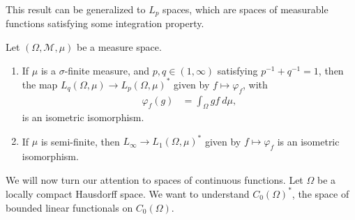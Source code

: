 \documentclass[10pt]{mypackage}
\begin{document}
This result can be generalized to $L_{p}$ spaces, which are spaces of measurable functions satisfying some integration property.
\begin{theorem}
  Let $\left(\Omega,\mathcal{M},\mu\right)$ be a measure space.
  \begin{enumerate}[(1)]
    \item If $\mu$ is a $\sigma$-finite measure, and $p,q\in \left(1,\infty\right)$ satisfying $p^{-1} + q^{-1} = 1$, then the map $L_q\left(\Omega,\mu\right)\rightarrow L_p\left(\Omega,\mu\right)^{\ast}$ given by $f \mapsto \varphi_f$, with
      \begin{align*}
        \varphi_f\left(g\right) &= \int_{\Omega}gf\:d\mu,
      \end{align*}
      is an isometric isomorphism.
    \item If $\mu$ is semi-finite, then $L_{\infty}\rightarrow L_{1}\left(\Omega,\mu\right)^{\ast}$ given by $f\mapsto \varphi_f$ is an isometric isomorphism.
  \end{enumerate}
\end{theorem}
We will now turn our attention to spaces of continuous functions. Let $\Omega$ be a locally compact Hausdorff space. We want to understand $C_0\left(\Omega\right)^{\ast}$, the space of bounded linear functionals on $C_0\left(\Omega\right)$.\newline
\end{document}
